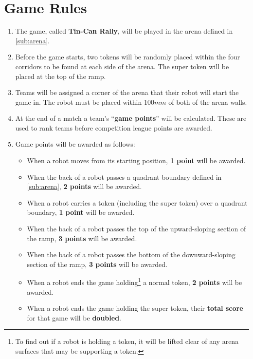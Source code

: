 \section {Game Rules}
\label{game-rules}

\begin{enumerate}
\item The game, called \textbf{Tin-Can Rally}, will be played in the arena defined in \autoref{sub:arena}.
\item Before the game starts, two tokens will be randomly placed within the four corridors to be found at each side of the arena.  The super token will be placed at the top of the ramp.
\item Teams will be assigned a corner of the arena that their robot will start the game in.
 The robot must be placed within $100mm$ of both of the arena walls.
\item At the end of a match a team's ``\textbf{game points}'' will be calculated.
 These are used to rank teams before competition league points are awarded.

\item Game points will be awarded as follows:

\begin{itemize}
\item When a robot moves from its starting position, \textbf{1 point} will be awarded.
\item When the back of a robot passes a quadrant boundary defined in \autoref{sub:arena}, \textbf{2 points} will be awarded.
\item When a robot carries a token (including the super token) over a quadrant boundary, \textbf{1 point} will be awarded.
\item When the back of a robot passes the top of the upward-sloping section of the ramp, \textbf{3 points} will be awarded.
\item When the back of a robot passes the bottom of the downward-sloping section of the ramp, \textbf{3 points} will be awarded.
\item When a robot ends the game holding\footnote{To find out if a robot is holding a token, it will be lifted clear of any arena surfaces that may be supporting a token.} a normal token, \textbf{2 points} will be awarded.
\item When a robot ends the game holding the super token, their \textbf{total score} for that game will be \textbf{doubled}.
\end{itemize}


\end{enumerate}
